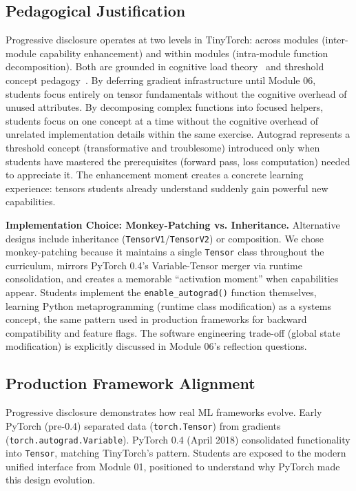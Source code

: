 \documentclass[10pt,twocolumn]{article}
\begin{document}
\subsection{Pedagogical Justification}

Progressive disclosure operates at two levels in TinyTorch: across modules (inter-module capability enhancement) and within modules (intra-module function decomposition). Both are grounded in cognitive load theory~\citep{sweller1988} and threshold concept pedagogy~\citep{meyer2003threshold}. By deferring gradient infrastructure until Module 06, students focus entirely on tensor fundamentals without the cognitive overhead of unused attributes. By decomposing complex functions into focused helpers, students focus on one concept at a time without the cognitive overhead of unrelated implementation details within the same exercise. Autograd represents a threshold concept (transformative and troublesome) introduced only when students have mastered the prerequisites (forward pass, loss computation) needed to appreciate it. The enhancement moment creates a concrete learning experience: tensors students already understand suddenly gain powerful new capabilities.

\textbf{Implementation Choice: Monkey-Patching vs. Inheritance.} Alternative designs include inheritance (\texttt{TensorV1}/\texttt{TensorV2}) or composition. We chose monkey-patching because it maintains a single \texttt{Tensor} class throughout the curriculum, mirrors PyTorch 0.4's Variable-Tensor merger via runtime consolidation, and creates a memorable ``activation moment'' when capabilities appear. Students implement the \texttt{enable\_autograd()} function themselves, learning Python metaprogramming (runtime class modification) as a systems concept, the same pattern used in production frameworks for backward compatibility and feature flags. The software engineering trade-off (global state modification) is explicitly discussed in Module 06's reflection questions.

\subsection{Production Framework Alignment}

Progressive disclosure demonstrates how real ML frameworks evolve. Early PyTorch (pre-0.4) separated data (\texttt{torch.Tensor}) from gradients (\texttt{torch.autograd.Variable}). PyTorch 0.4 (April 2018) \citep{pytorch04release} consolidated functionality into \texttt{Tensor}, matching TinyTorch's pattern. Students are exposed to the modern unified interface from Module 01, positioned to understand why PyTorch made this design evolution.
\end{document}
